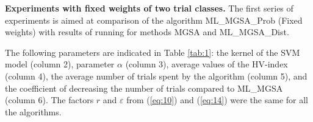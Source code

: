 \documentclass[runningheads]{llncs}
\begin{document}
\textbf{Experiments with fixed weights of two trial classes.} The first series of experiments is aimed at comparison of the algorithm ML\_MGSA\_Prob (Fixed weights) with results of running for methods MGSA and ML\_MGSA\_Dist. 

The following parameters are indicated in Table \ref{tab:1}: the kernel of the SVM model (column 2), parameter $\alpha$ (column 3), average values of the HV-index (column 4), the average number of trials spent by the algorithm (column 5), and the coefficient of decreasing the number of trials compared to ML\_MGSA (column 6). The factors $r$ and $\varepsilon$ from (\ref{eq:10}) and (\ref{eq:14}) were the same for all the algorithms.

\begin{table}[t]
\centering
\caption{Results of computational experiments}
\label{tab:1}
\end{table}
\end{document}
